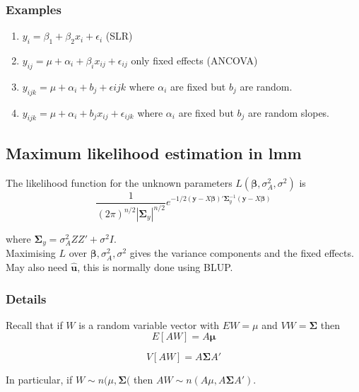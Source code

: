 \documentclass[12pt,a4paper]{article}
\theoremstyle{regla}
\theoremstyle{remark}
\theoremstyle{definition}
\theoremstyle{nonumberbreak}
\begin{document}
\subsubsection{Examples}
\begin{xmpl}
\begin{enumerate}
\item $y_i = \beta_1 + \beta_2 x_i + \epsilon_i$ (SLR)
\item $y_{ij} = \mu + \alpha_i + \beta_i x_{ij} + \epsilon_{ij}$ only fixed effects (ANCOVA)
\item $y_{ijk} = \mu + \alpha_i + b_j + \epsilon{ijk}$ where $\alpha_i$ are fixed but $b_j$ are random.
\item $y_{ijk} = \mu  + \alpha_i + b_j x_{ij} + \epsilon_{ijk}$ where $\alpha_i$ are fixed but $b_j$ are random slopes.
\end{enumerate}
\end{xmpl}

\subsection{Maximum likelihood estimation in lmm}
\begin{fbox}
\begin{minipage}{0.97\textwidth}
The likelihood function for the unknown parameters $L(\boldsymbol{\beta},\sigma^2_A, \sigma^2)$ is
$$ \frac{1}{(2\pi)^{n/2} \left| \boldsymbol{\Sigma}_y \right| ^{n/2}} 
e^{-1/2 (\mathbf{y}-X\boldsymbol{\beta})' \boldsymbol{\Sigma}^{-1}_y (\mathbf{y}-X\boldsymbol{\beta})}$$

where $\boldsymbol{\Sigma}_y =  \sigma^2_A Z Z' + \sigma^2 I$.\\

Maximising $L$ over $\boldsymbol{\beta},\sigma^2_A, \sigma^2$ gives the variance components and the fixed effects. May also need $\mathbf{\hat{u}}$, this is normally done using BLUP.
\end{minipage}
\end{fbox}
\subsubsection{Details}
Recall that if $W$ is a random variable vector with $EW = \mu$ and $VW= \boldsymbol{\Sigma}$ then 
$$E[AW] = A\mathbf{\mu}$$

 
$$V[AW]= A \boldsymbol{\Sigma} A'$$

In particular, if $W \sim n(\mu, \boldsymbol{\Sigma}($ then $AW \sim n(A\mu, A \boldsymbol{\Sigma} A')$.\\
\end{document}
